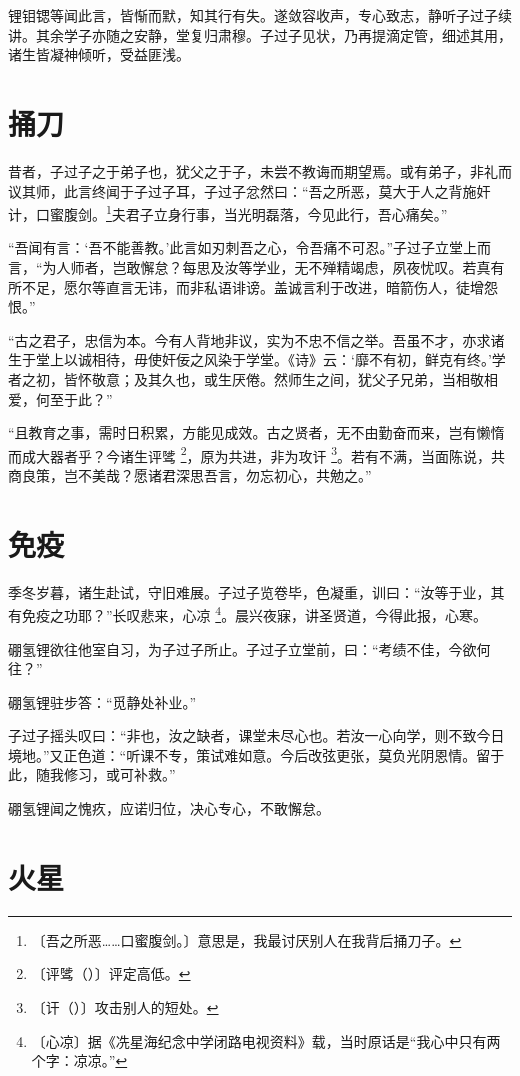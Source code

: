 \documentclass[b5paper,zihao=-4]{ctexbook}
\newcommand{\zhushi}[2]{#1 \footnote{〔#1〕#2}}
\newcommand{\zhushipy}[3]{#1 \footnote{〔#2〕#3}}
\begin{document}
锂钼锶等闻此言，皆惭而默，知其行有失。遂敛容收声，专心致志，静听子过子续讲。其余学子亦随之安静，堂复归肃穆。子过子见状，乃再提滴定管，细述其用，诸生皆凝神倾听，受益匪浅。
\chapter{捅刀}

昔者，子过子之于弟子也，犹父之于子，未尝不教诲而期望焉。或有弟子，非礼而议其师，此言终闻于子过子耳，子过子忿然曰：“吾之所恶，莫大于人之背施奸计，口蜜腹剑。\footnote{〔吾之所恶……口蜜腹剑。〕意思是，我最讨厌别人在我背后捅刀子。}夫君子立身行事，当光明磊落，今见此行，吾心痛矣。”

“吾闻有言：‘吾不能善教。’此言如刃刺吾之心，令吾痛不可忍。”子过子立堂上而言，“为人师者，岂敢懈怠？每思及汝等学业，无不殚精竭虑，夙夜忧叹。若真有所不足，愿尔等直言无讳，而非私语诽谤。盖诚言利于改进，暗箭伤人，徒增怨恨。”

“古之君子，忠信为本。今有人背地非议，实为不忠不信之举。吾虽不才，亦求诸生于堂上以诚相待，毋使奸佞之风染于学堂。《诗》云：‘靡不有初，鲜克有终。’学者之初，皆怀敬意；及其久也，或生厌倦。然师生之间，犹父子兄弟，当相敬相爱，何至于此？”

“且教育之事，需时日积累，方能见成效。古之贤者，无不由勤奋而来，岂有懒惰而成大器者乎？今诸生\zhushipy{评骘}{评骘（）}{评定高低。}，原为共进，非为攻\zhushipy{讦}{讦（）}{攻击别人的短处。}。若有不满，当面陈说，共商良策，岂不美哉？愿诸君深思吾言，勿忘初心，共勉之。”

\chapter{免疫}

季冬岁暮，诸生赴试，守旧难展。子过子览卷毕，色凝重，训曰：“汝等于业，其有免疫之功耶？”长叹悲来，\zhushi{心凉}{据《冼星海纪念中学闭路电视资料》载，当时原话是“我心中只有两个字：凉凉。”}。晨兴夜寐，讲圣贤道，今得此报，心寒。

硼氢锂欲往他室自习，为子过子所止。子过子立堂前，曰：“考绩不佳，今欲何往？”

硼氢锂驻步答：“觅静处补业。”

子过子摇头叹曰：“非也，汝之缺者，课堂未尽心也。若汝一心向学，则不致今日境地。”又正色道：“听课不专，策试难如意。今后改弦更张，莫负光阴恩情。留于此，随我修习，或可补救。”

硼氢锂闻之愧疚，应诺归位，决心专心，不敢懈怠。

\chapter{火星}
\end{document}
